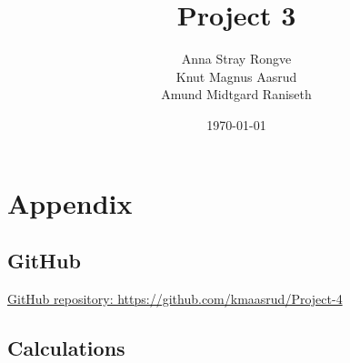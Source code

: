 \documentclass{article}
\title{Project 3}
\author{Anna Stray Rongve \\ Knut Magnus Aasrud \\ Amund Midtgard Raniseth}
\date{\today}
\begin{document}
\maketitle













\section{Appendix}
\subsection{GitHub}
\href{https://github.com/kmaasrud/Project-4}{GitHub repository: https://github.com/kmaasrud/Project-4}
\subsection{Calculations}
\end{document}
